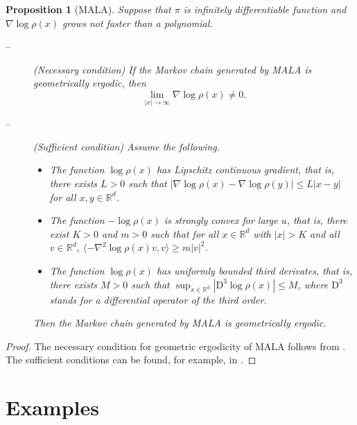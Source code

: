 \documentclass[preprint, 3p, authoryear]{elsarticle}
\newcommand{\R}{\mathbb R}
\newtheorem{proposition}{Proposition}
\theoremstyle{definition}
\begin{document}
\begin{proposition}[MALA]
\label{prop:mala-erg}
Suppose that $\pi$ is infinitely differentiable function and $\nabla \log \rho (x)$ grows not faster than a polynomial.
\begin{description}
	\item[--] (Necessary condition) If the Markov chain generated by MALA is geometrically ergodic, 
	then 
	\[
		\lim_{|x|\to\infty} \nabla \log \rho (x)  \ne 0.
	\]
	\item[--] (Sufficient condition) 
	Assume the following.
	\begin{itemize}
		\item [(a)] The function $\log \rho(x)$ has Lipschitz continuous gradient, that is,
		there exists $L>0$ such that $| \nabla\log \rho(x) - \nabla\log \rho(y) | \leq L | x-y |$  for all $x,y\in\R^d$.
		\item [(b)] The function $-\log \rho(x)$ is strongly convex for large $u$, that is, there exist $K>0$ and $m>0$ such that for all $x\in\R^d$ with $|x|>K$ and all $v\in\R^d$,
		$\langle-\nabla^2 \log \rho(x) v , v \rangle \ge m |v|^2$.
		\item [(c)]The function $\log \rho(x)$ has uniformly bounded third derivates, that is, there exists $M>0$ such that $\sup_{x\in\R^d} |\mathrm{D}^3  \log \rho(x) | \leq M$,
		where $\mathrm{D}^3$ stands for a differential operator of the third order.
	\end{itemize}
	Then the Markov chain generated by MALA is geometrically ergodic. 
\end{description}
\end{proposition}
\begin{proof}
The necessary condition for geometric ergodicity of MALA follows from \cite[Theorem 4.3]{robertstweedie1996}. 
The sufficient conditions can be found, for example, in \cite[Section 6]{brosse2018diffusion}.
\end{proof}
\section{Examples}\label{sec:examples}
\end{document}
